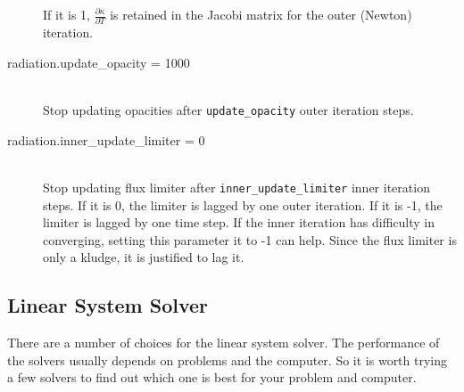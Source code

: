 \begin{description}
  If it is 1, $\frac{\partial \kappa}{\partial T}$ is retained in the
  Jacobi matrix for the outer (Newton) iteration.
\item[radiation.update\_opacity = 1000] \hfill \\
  Stop updating opacities after {\tt update\_opacity} outer iteration steps.
\item[radiation.inner\_update\_limiter = 0] \hfill \\
  Stop updating flux limiter after {\tt inner\_update\_limiter} inner
  iteration steps.  If it is 0, the limiter is lagged by one outer
  iteration.  If it is -1, the limiter is lagged by one time step.  If
  the inner iteration has difficulty in converging, setting this
  parameter it to -1 can help.  Since the flux limiter is only a
  kludge, it is justified to lag it.
\end{description}


\subsection{Linear System Solver}
\label{sec:hypre}

There are a number of choices for the linear system solver.  The
performance of the solvers usually depends on problems and the
computer.  So it is worth trying a few solvers to find out which one
is best for your problem and computer.

